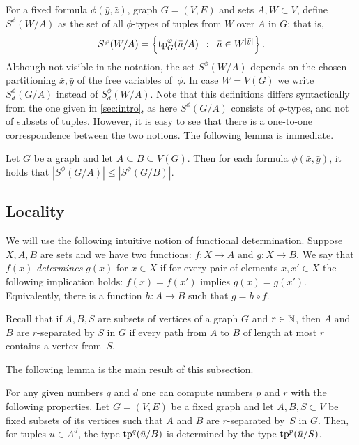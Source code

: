 For a fixed formula $\phi(\bar y,\bar z)$,  graph $G=(V,E)$ and sets $A,W\subset V$, define
 $S^\phi(W/A)$ as the set of all $\phi$-types of tuples from $W$ over $A$ in $G$; that is, 
\begin{equation*}
S^\varphi(W/A)=\left\{\mathrm{tp}^\varphi_G(\bar u/A) \,~:~\, \bar u\in W^{|\bar y|} \right\}.
\end{equation*}
Although not visible in the notation, the set $S^\phi(W/A)$ depends on the chosen partitioning $\bar x,\bar y$ of the free variables of~$\phi$.
In case $W=V(G)$ we write $S^{\phi}_d(G/A)$ instead of $S^{\phi}_d(W/A)$.
Note that this definitions differs syntactically from the one given in \autoref{sec:intro}, as here $S^{\phi}(G/A)$ consists of $\phi$-types, and not of subsets of tuples.
However, %
it is easy to see that there is a one-to-one correspondence between 
the two notions. %
%
The following lemma is immediate.
\begin{lemma}\label{lem:types-over-B}
Let $G$ be a graph and let $A\subseteq B\subseteq V(G)$. Then for each formula $\phi(\bar x,\bar y)$, it holds that
$|S^\phi(G/A)|\leq |S^\phi(G/B)|$. 
\end{lemma}

\subsection{Locality}
We will use the following intuitive notion of functional determination.
Suppose $X,A,B$ are sets and we have two functions: $f\colon X\to A$ and $g\colon X\to B$.
We say that $f(x)$ {\em{determines}} $g(x)$ for $x\in X$ if for every pair of elements $x,x'\in X$ the following implication holds: $f(x)=f(x')$ implies $g(x)=g(x')$.
Equivalently, there is a function $h\colon A\to B$ such that $g=h\circ f$.

Recall that if $A,B,S$ are subsets of vertices of a graph $G$ and $r\in\mathbb{N}$,
then $A$ and $B$ are $r$-separated by $S$ in $G$
if every path from $A$ to $B$ of length at most $r$ contains a vertex from~$S$.

\medskip
The following lemma is the main result of this subsection. 

\begin{lemma}[$\star$]\label{lem:types}
For any given numbers $q$ and $d$
one can compute numbers $p$ and $r$ with the following properties.
Let $G=(V,E)$ be a fixed graph and let $A,B,S\subset V$ be fixed subsets of its vertices
such that $A$ and $B$ are $r$-separated by~$S$ in $G$.
Then, for tuples $\bar u\in A^{d}$, the type $\mathrm{tp}^q(\bar u/B)$ is determined by the type $\mathrm{tp}^{p}(\bar u/S)$.
\end{lemma}

